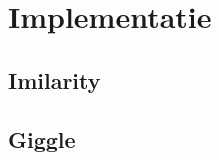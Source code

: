 \documentclass[dutch,11pt,cite,titlepage]{report}
\begin{document}
\chapter{Implementatie}

\section{Imilarity}
\section{Giggle}


\nocite{*}
 

\end{document}
